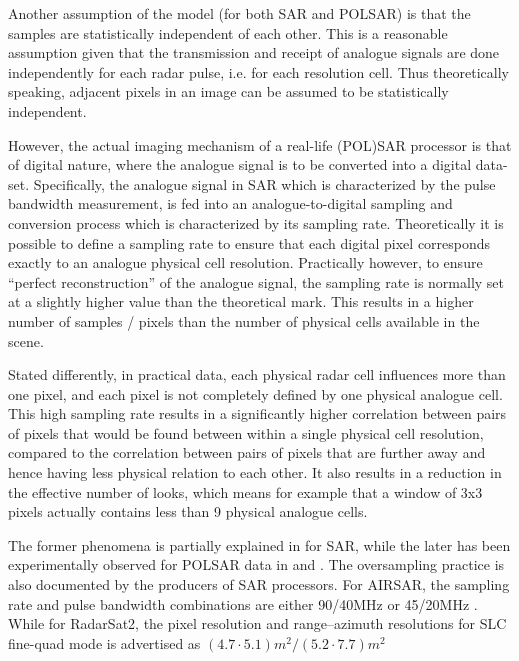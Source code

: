 Another assumption of the model (for both SAR and POLSAR) is that the samples are statistically independent of each other.
This is a reasonable assumption given that 
  the transmission and receipt of analogue signals are done independently for each radar pulse, i.e. for each resolution cell.
Thus theoretically speaking, adjacent pixels in an image can be assumed to be statistically independent.

However, the actual imaging mechanism of a real-life (POL)SAR processor is that of digital nature,
where the analogue signal is to be converted into a digital data-set. 
Specifically, the analogue signal in SAR 
  which is characterized by the pulse bandwidth measurement,
  is fed into an analogue-to-digital sampling and conversion process 
  which is characterized by its sampling rate.
Theoretically it is possible to define a sampling rate to ensure that each digital pixel corresponds exactly to an analogue physical cell resolution.
Practically however, to ensure ``perfect reconstruction'' of the analogue signal, the sampling rate is normally set at a slightly higher value than the theoretical mark.
This results in a higher number of samples / pixels than the number of physical cells available in the scene.  

Stated differently, in practical data, each physical radar cell influences more than one pixel,
  and each pixel is not completely defined by one physical analogue cell.
This high sampling rate results in 
  a significantly higher correlation between pairs of pixels that would be found between within a single physical cell resolution, 
  compared to the correlation between pairs of pixels that are further away and hence having less physical relation to each other.
It also results in a reduction in the effective number of looks, 
  which means for example that a window of 3x3 pixels actually contains less than 9 physical analogue cells.
  
The former phenomena is partially explained in \cite{Raney_1988_TGRS_666} for SAR,
  while the later has been experimentally observed for POLSAR data in \cite{Lee_1994_TGRS_1017} and \cite{Anfinsen_2009_TGRS_3795}.
The oversampling practice is also documented by the producers of SAR processors.
For AIRSAR, the sampling rate and pulse bandwidth combinations are either 90/40MHz or 45/20MHz \cite{JPL_2013_Web_AIRSAR_Impl}.
While for RadarSat2, the pixel resolution and range--azimuth resolutions for SLC fine-quad mode is advertised as $(4.7 \cdot 5.1)m^2/(5.2 \cdot 7.7)m^2$ \cite{MDA_2013_Web_RadatSat2_Description}


